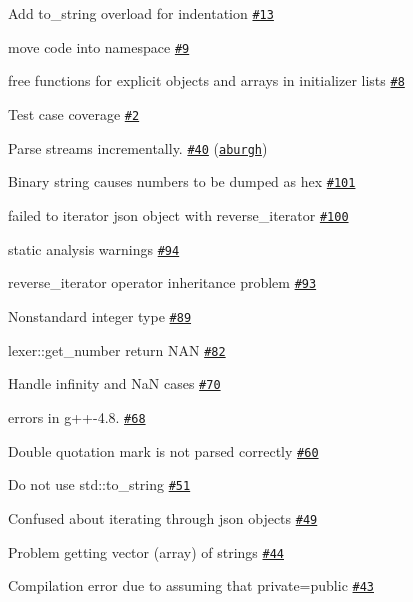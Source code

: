 \begin{DoxyItemize}
\item Add to\+\_\+string overload for indentation \href{https://github.com/nlohmann/json/issues/13}{\tt \#13}
\item move code into namespace \href{https://github.com/nlohmann/json/issues/9}{\tt \#9}
\item free functions for explicit objects and arrays in initializer lists \href{https://github.com/nlohmann/json/issues/8}{\tt \#8}
\item Test case coverage \href{https://github.com/nlohmann/json/issues/2}{\tt \#2}
\item Parse streams incrementally. \href{https://github.com/nlohmann/json/pull/40}{\tt \#40} (\href{https://github.com/aburgh}{\tt aburgh})
\item Binary string causes numbers to be dumped as hex \href{https://github.com/nlohmann/json/issues/101}{\tt \#101}
\item failed to iterator json object with reverse\+\_\+iterator \href{https://github.com/nlohmann/json/issues/100}{\tt \#100}
\item static analysis warnings \href{https://github.com/nlohmann/json/issues/94}{\tt \#94}
\item reverse\+\_\+iterator operator inheritance problem \href{https://github.com/nlohmann/json/issues/93}{\tt \#93}
\item Nonstandard integer type \href{https://github.com/nlohmann/json/issues/89}{\tt \#89}
\item lexer\+::get\+\_\+number return N\+AN \href{https://github.com/nlohmann/json/issues/82}{\tt \#82}
\item Handle infinity and NaN cases \href{https://github.com/nlohmann/json/issues/70}{\tt \#70}
\item errors in g++-\/4.8. \href{https://github.com/nlohmann/json/issues/68}{\tt \#68}
\item Double quotation mark is not parsed correctly \href{https://github.com/nlohmann/json/issues/60}{\tt \#60}
\item Do not use std\+::to\+\_\+string \href{https://github.com/nlohmann/json/issues/51}{\tt \#51}
\item Confused about iterating through json objects \href{https://github.com/nlohmann/json/issues/49}{\tt \#49}
\item Problem getting vector (array) of strings \href{https://github.com/nlohmann/json/issues/44}{\tt \#44}
\item Compilation error due to assuming that private=public \href{https://github.com/nlohmann/json/issues/43}{\tt \#43}

\end{DoxyItemize}

